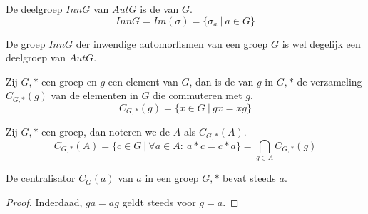 \documentclass[main.tex]{subfiles}
\begin{document}
\begin{de}
  \label{de:inn-g}
  De deelgroep $InnG$ van $AutG$ is de  van $G$.
  \[ InnG = Im(\sigma) = \{ \sigma_{a}\ |\ a \in G \} \]
\end{de}

\begin{st}
  De groep $InnG$ der inwendige automorfismen van een groep $G$ is wel degelijk een deelgroep van $AutG$.
\end{st}


\begin{de}
  Zij $G,*$ een groep en $g$ een element van $G$, dan is de  van $g$ in $G,*$ de verzameling $C_{G,*}(g)$ van de elementen in $G$ die commuteren met $g$.
  \[ C_{G,*}(g) = \{ x \in G\ |\ gx = xg \} \]
\end{de}

\begin{de}
  Zij $G,*$ een groep, dan noteren we de  $A$ als $C_{G,*}(A)$.
  \[ C_{G,*}(A) = \{ c\in G \ |\ \forall a\in A:\ a*c = c*a \} = \bigcap_{g\in A}C_{G,*}(g) \]
\end{de}

\begin{ei}
  \label{ei:centralisator-bevat-element}
  De centralisator $C_{G}(a)$ van $a$ in een groep $G,*$ bevat steeds $a$.
  
  \begin{proof}
    Inderdaad, $ga = ag$ geldt steeds voor $g=a$.
  \end{proof}
\end{ei}
\end{document}
